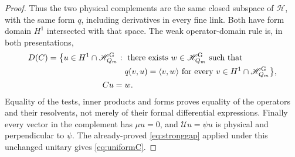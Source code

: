 \documentclass[11pt]{article}
\newcommand{\HH}{\mathscr H}
\begin{document}
\begin{proof}
Thus the two physical complements are the same closed subspace
of $\HH$, with the same form $q$, including derivatives in every
fine link. Both have form domain $H^1$ intersected with that space.
The weak operator-domain rule is, in both presentations,
\[
\begin{aligned}
 D(C)=\bigl\{u\in H^1\cap\HH_{Q_m}^{\rm G}:{}&
 \text{ there exists }w\in\HH_{Q_m}^{\rm G}\text{ such that}\\
 &q(v,u)=\langle v,w\rangle
 \text{ for every }v\in H^1\cap\HH_{Q_m}^{\rm G}\bigr\},\\
 Cu={}&w.
\end{aligned}
\]
Equality of the tests, inner products and forms proves equality
of the operators and their resolvents, not merely of their formal
differential expressions. Finally every vector in the complement
has $\mu u=0$, and $\mathcal Uu=\psi u$ is physical and perpendicular
to $\psi$. The already-proved \eqref{eq:stronggap} applied under
this unchanged unitary gives \eqref{eq:uniformC}.
\end{proof}
\end{document}
